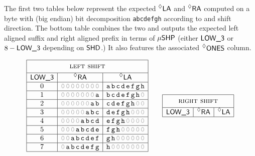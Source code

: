 The first two tables below represent the expected $\prescript{\lozenge}{}{\textsf{LA}}$ and $\prescript{\lozenge}{}{\textsf{RA}}$ computed on a byte with (big endian) bit decomposition \texttt{abcdefgh} according to \LT{} and shift direction. The bottom table combines the two and outputs the expected left aligned suffix and right aligned prefix in terms of $\textsf{$\mu$SHP}{}$ (either $\textsf{LOW\_3}$ or $8-\textsf{LOW\_3}$ depending on $\textsf{SHD}$.) It also features the associated $\prescript{\lozenge}{}{\textsf{ONES}}{}$ column.

\begin{figure}[!h]
\renewcommand{\arraystretch}{1.2}
\[
    \begin{array}{|c|r|l|}
        \hline
        \multicolumn{3}{|c|}{\phantom{\Big(}\textsc{left shift}\phantom{\Big(}} \\
        \hline
        \LT{} & \multicolumn{1}{c|}{\decoded{\ra}} & \multicolumn{1}{c|}{\decoded{\la}} \\ \hline
        0
        &\texttt{\gray{0\,0\,0\,0\,0\,0\,0\,0}}
        &\texttt{a\,b\,c\,d\,e\,f\,g\,h}
        \\ \hline
        1
        &\texttt{\gray{0\,0\,0\,0\,0\,0\,0}\,a}
        &\texttt{b\,c\,d\,e\,f\,g\,h\,\gray{0}}
        \\ \hline
        2
        &\texttt{\gray{0\,0\,0\,0\,0\,0}\,a\,b}
        &\texttt{c\,d\,e\,f\,g\,h\,\gray{0\,0}}
        \\ \hline
        3
        &\texttt{\gray{0\,0\,0\,0\,0}\,a\,b\,c}
        &\texttt{d\,e\,f\,g\,h\,\gray{0\,0\,0}}
        \\ \hline
        4
        &\texttt{\gray{0\,0\,0\,0}\,a\,b\,c\,d}
        &\texttt{e\,f\,g\,h\,\gray{0\,0\,0\,0}}
        \\ \hline
        5
        &\texttt{\gray{0\,0\,0}\,a\,b\,c\,d\,e}
        &\texttt{f\,g\,h\,\gray{0\,0\,0\,0\,0}}
        \\ \hline
        6
        &\texttt{\gray{0\,0}\,a\,b\,c\,d\,e\,f}
        &\texttt{g\,h\,\gray{0\,0\,0\,0\,0\,0}}
        \\ \hline
        7
        &\texttt{\gray{0}\,a\,b\,c\,d\,e\,f\,g}
        &\texttt{h\,\gray{0\,0\,0\,0\,0\,0\,0}}
        \\ \hline
    \end{array}
    \qquad
    \begin{array}{|c|r|l|}
        \hline
        \multicolumn{3}{|c|}{\phantom{\Big(}\textsc{right shift}\phantom{\Big(}} \\
        \hline
        \LT{} & \multicolumn{1}{c|}{\decoded{\ra}} & \multicolumn{1}{c|}{\decoded{\la}} \\ \hline

\end{array}\]
\end{figure}
